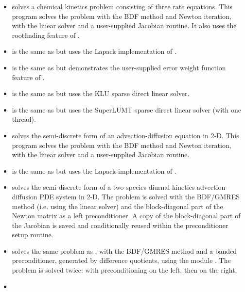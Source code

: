 \begin{itemize}
\item {}
  solves a chemical kinetics problem consisting of three rate equations.
  \newline
  This program solves the problem with the BDF method and Newton          
  iteration, with the {\cvdense} linear solver and a user-supplied    
  Jacobian routine.  It also uses the rootfinding feature of {\cvode}.
\item {}
  is the same as  but uses the Lapack implementation of {\cvdense}.
\item {}
  is the same as  but demonstrates the user-supplied error
  weight function feature of {\cvode}.
\item {}
  is the same as  but uses the KLU sparse direct linear solver.
\item {}
  is the same as  but uses the SuperLUMT sparse direct linear solver
  (with one thread).
\item {}
  solves the semi-discrete form of an advection-diffusion equation in 2-D. 
  \newline
  This program solves the problem with the BDF method and Newton          
  iteration, with the {\cvband} linear solver and a user-supplied     
  Jacobian routine.
\item {}
  is the same as  but uses the Lapack implementation of {\cvband}.
\item {}
  solves the semi-discrete form of a two-species diurnal kinetics
  advection-diffusion PDE system in 2-D.
  \newline
  The problem is solved with the BDF/GMRES method (i.e.    
  using the {\cvspgmr} linear solver) and the block-diagonal part of the  
  Newton matrix as a left preconditioner. A copy of the block-diagonal 
  part of the Jacobian is saved and conditionally reused within the    
  preconditioner setup routine.
\item {}
  solves the same problem as , with the BDF/GMRES method 
  and a banded preconditioner, generated by difference quotients, 
  using the module {\cvbandpre}.
  \newline
  The problem is solved twice: with preconditioning on the left,
  then on the right.
\item {}

\end{itemize}
